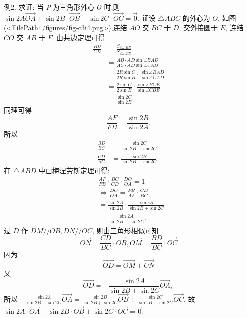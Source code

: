 例2. 求证: 当 $P$ 为三角形外心 $O$ 时,则 $\sin 2 A \overrightarrow{O A}+\sin 2 B \cdot \overrightarrow{O B}+\sin 2 C \cdot \overrightarrow{O C}=\overrightarrow{0}$.
证设 $\triangle A B C$ 的外心为 $O$, 如图(<FilePath:./figures/fig-c3i4.png>),连结 $A O$ 交 $B C$ 于 $D$, 交外接圆于 $E$, 连结 $C O$ 交 $A B$ 于 $F$.
由共边定理可得
$$
\begin{aligned}
\frac{B D}{C D} & =\frac{S_{\triangle A B D}}{S_{\triangle A C D}} \\
& =\frac{A B \cdot A D \sin \angle B A D}{A C \cdot A D \sin \angle C A D} \\
& =\frac{2 R \sin C}{2 R \sin B} \cdot \frac{\sin \angle B A D}{\sin \angle C A D} \\
& =\frac{2 \sin C}{2 \sin B} \cdot \frac{\sin \angle B C E}{\sin \angle C B E} \\
& =\frac{\sin 2 C}{\sin 2 B} .
\end{aligned}
$$
同理可得
$$
\frac{A F}{F B}=\frac{\sin 2 B}{\sin 2 A} .
$$
所以
$$
\begin{aligned}
\frac{B D}{B C} & =\frac{\sin 2 C}{\sin 2 B+\sin 2 C}, \\
\frac{C D}{B C} & =\frac{\sin 2 B}{\sin 2 B+\sin 2 C}
\end{aligned}
$$
在 $\triangle A B D$ 中由梅涅劳斯定理可得:
$$
\begin{aligned}
& \frac{A F}{F B} \cdot \frac{B C}{C D} \cdot \frac{D O}{O A}=1 \\
& \Rightarrow \frac{D O}{O A}=\frac{F B}{A F} \cdot \frac{C D}{B C} \\
& =\frac{\sin 2 A}{\sin 2 B} \cdot \frac{\sin 2 B}{\sin 2 B+\sin 2 C} \\
& =\frac{\sin 2 A}{\sin 2 B+\sin 2 C} .
\end{aligned}
$$
过 $D$ 作 $D M / / O B, D N / / O C$, 则由三角形相似可知
$$
\overrightarrow{O N}=\frac{C D}{B C} \cdot \overrightarrow{O B}, \overrightarrow{O M}=\frac{B D}{B C} \cdot \overrightarrow{O C}
$$
因为
$$
\overrightarrow{O D}=\overrightarrow{O M}+\overrightarrow{O N}
$$
又
$$
\overrightarrow{O D}=-\frac{\sin 2 A}{\sin 2 B+\sin 2 C} \overrightarrow{O A} \text {, }
$$
所以 $-\frac{\sin 2 A}{\sin 2 B+\sin 2 C} \overrightarrow{O A}=\frac{\sin 2 B}{\sin 2 B+\sin 2 C} \overrightarrow{O B}+\frac{\sin 2 C}{\sin 2 B+\sin 2 C} \overrightarrow{O C}$.
故 $\sin 2 A \cdot \overrightarrow{O A}+\sin 2 B \cdot \overrightarrow{O B}+\sin 2 C \cdot \overrightarrow{O C}=\overrightarrow{0}$.




